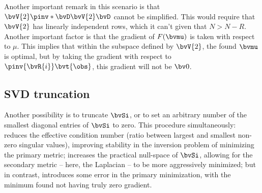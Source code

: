 {Another important remark in this scenario is that $\bvV{2} \pinv*{\bvD \bvV{2}} \bvD$ cannot be simplified. This would require that $\bvV{2}$ has linearly independent rows, which it can't given that $N > N-R$. Another important factor is that the gradient of $F(\bvmu)$ is taken with respect to $\mu$. This implies that within the subspace defined by $\bvV{2}$, the found $\bvmu$ is optimal, but by taking the gradient with respect to $\pinv{\bvR{i}} \bvt{\obs}$, this gradient will not be $\bv0$.

\subsection{SVD truncation}

Another possibility is to truncate $\bvSi$, or to set an arbitrary number of the smallest diagonal entries of $\bvSi$ to zero. This procedure simultaneously: reduces the effective condition number (ratio between largest and smallest non-zero singular values), improving stability in the inversion problem of minimizing the primary metric; increases the practical null-space of $\bvSi$, allowing for the secondary metric -- here, the Laplacian -- to be more aggressively minimized; but in contrast, introduces some error in the primary minimization, with the minimum found not having truly zero gradient.

}
